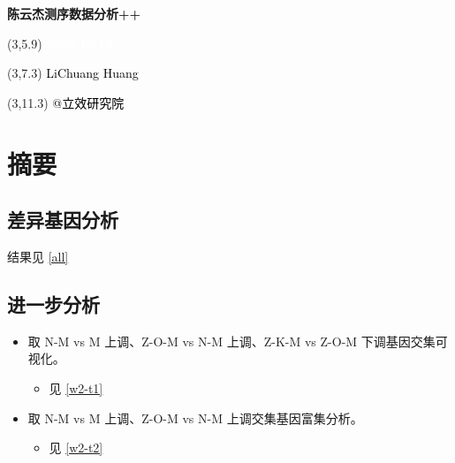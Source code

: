 \documentclass[
]{article}
\author{}
\date{\vspace{-2.5em}}
\providecommand{\tightlist}{%
  \setlength{\itemsep}{0pt}\setlength{\parskip}{0pt}}
\begin{document}
\begin{titlepage} 
\begin{center} \textbf{\Huge
陈云杰测序数据分析++} \vspace{4em}
\begin{textblock}{10}(3,5.9) \huge
\textbf{\textcolor{white}{2023-12-14}}
\end{textblock} \begin{textblock}{10}(3,7.3)
\Large \textcolor{black}{LiChuang Huang}
\end{textblock} \begin{textblock}{10}(3,11.3)
\Large \textcolor{black}{@立效研究院}
\end{textblock} \end{center} \end{titlepage}
\restoregeometry


\tableofcontents

\listoffigures

\listoftables

\newpage


\hypertarget{abstract}{%
\section{摘要}\label{abstract}}

\hypertarget{ux5deeux5f02ux57faux56e0ux5206ux6790}{%
\subsection{差异基因分析}\label{ux5deeux5f02ux57faux56e0ux5206ux6790}}

结果见 \ref{all}

\hypertarget{ux8fdbux4e00ux6b65ux5206ux6790}{%
\subsection{进一步分析}\label{ux8fdbux4e00ux6b65ux5206ux6790}}

\begin{itemize}
\tightlist
\item
  取 N-M vs M 上调、Z-O-M vs N-M 上调、Z-K-M vs Z-O-M 下调基因交集可视化。

  \begin{itemize}
  \tightlist
  \item
    见 \ref{w2-t1}
  \end{itemize}
\item
  取 N-M vs M 上调、Z-O-M vs N-M 上调交集基因富集分析。

  \begin{itemize}
  \tightlist
  \item
    见 \ref{w2-t2}
  \end{itemize}
\end{itemize}
\end{document}
